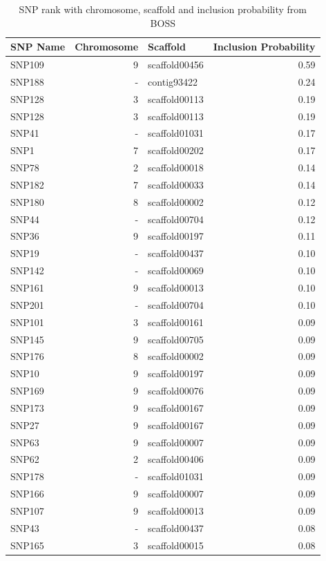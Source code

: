 \begin{longtable}{lrlr}
\caption{SNP rank with chromosome, scaffold and inclusion probability
  from BOSS}
\label{tab:rank}\\
\hline 
 SNP Name & Chromosome & Scaffold & Inclusion Probability \\ 
  \hline
SNP109 &   9 & scaffold00456 & 0.59 \\ 
  SNP188 & - & contig93422 & 0.24 \\ 
  SNP128 &   3 & scaffold00113 & 0.19 \\ 
  SNP128 &   3 & scaffold00113 & 0.19 \\ 
  SNP41 & - & scaffold01031 & 0.17 \\ 
  SNP1 &   7 & scaffold00202 & 0.17 \\ 
  SNP78 &   2 & scaffold00018 & 0.14 \\ 
  SNP182 &   7 & scaffold00033 & 0.14 \\ 
  SNP180 &   8 & scaffold00002 & 0.12 \\ 
  SNP44 & - & scaffold00704 & 0.12 \\ 
  SNP36 &   9 & scaffold00197 & 0.11 \\ 
  SNP19 & - & scaffold00437 & 0.10 \\ 
  SNP142 & - & scaffold00069 & 0.10 \\ 
  SNP161 &   9 & scaffold00013 & 0.10 \\ 
  SNP201 & - & scaffold00704 & 0.10 \\ 
  SNP101 &   3 & scaffold00161 & 0.09 \\ 
  SNP145 &   9 & scaffold00705 & 0.09 \\ 
  SNP176 &   8 & scaffold00002 & 0.09 \\ 
  SNP10 &   9 & scaffold00197 & 0.09 \\ 
  SNP169 &   9 & scaffold00076 & 0.09 \\ 
  SNP173 &   9 & scaffold00167 & 0.09 \\ 
  SNP27 &   9 & scaffold00167 & 0.09 \\ 
  SNP63 &   9 & scaffold00007 & 0.09 \\ 
  SNP62 &   2 & scaffold00406 & 0.09 \\ 
  SNP178 & - & scaffold01031 & 0.09 \\ 
  SNP166 &   9 & scaffold00007 & 0.09 \\ 
  SNP107 &   9 & scaffold00013 & 0.09 \\ 
  SNP43 & - & scaffold00437 & 0.08 \\ 
  SNP165 &   3 & scaffold00015 & 0.08 \\ 

\end{longtable}
